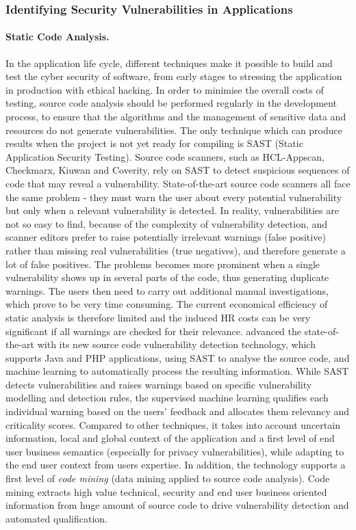 \documentclass[a4paper,11pt]{article}
\begin{document}
\subsubsection{Identifying Security Vulnerabilities in Applications}
\label{sect:background-first}
\label{sect:identifying}

\paragraph{Static Code Analysis.}
In the application life cycle, different techniques make it possible to build and test the cyber security of software, from early stages to stressing the application in production with ethical hacking. In order to minimise the overall costs of testing, source code analysis should be performed regularly in the development process, to ensure that the algorithms and the management of sensitive data and resources do not generate vulnerabilities. The only technique which can produce results when the project is not yet ready for compiling is SAST (Static Application Security Testing). Source code scanners, such as HCL-Appscan, Checkmarx, Kiuwan and Coverity, rely on SAST to detect suspicious sequences of code that may reveal a vulnerability.
%
State-of-the-art source code scanners all face the same problem - they must warn the user about every potential vulnerability but only when a relevant vulnerability is detected. In reality, vulnerabilities are not so easy to find, because of the complexity of vulnerability detection, and scanner editors prefer to raise potentially irrelevant warnings (false positive) rather than missing real vulnerabilities (true negatives), and therefore generate a lot of false positives. The problems becomes more prominent when a single vulnerability shows up in several parts of the code, thus generating duplicate warnings. The users then need to carry out additional manual investigations, which prove to be very time consuming. The current economical efficiency of static analysis is therefore limited and the induced HR costs can be very significant if all warnings are checked for their relevance.
%
\YAGshort{} advanced the state-of-the-art with its new source code vulnerability detection technology, which supports Java and PHP applications, using SAST to analyse the source code, and machine learning to automatically process the resulting information. While SAST detects vulnerabilities and raises warnings based on specific vulnerability modelling and detection rules, the supervised machine learning qualifies each individual warning based on the users' feedback and allocates them relevancy and criticality scores. Compared to other techniques, it takes into account uncertain information, local and global context of the application and a first level of end user business semantics (especially for privacy vulnerabilities), while adapting to the end user context from users expertise. In addition, the technology supports a first level of \emph{code mining} (data mining applied to source code analysis). Code mining extracts high value technical, security and end user business oriented information from huge amount of source code to drive vulnerability detection and automated qualification.
\end{document}
